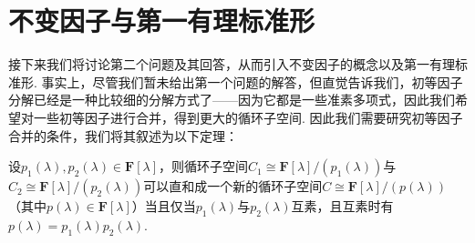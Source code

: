 \section{不变因子与第一有理标准形}
接下来我们将讨论第二个问题及其回答，从而引入不变因子的概念以及第一有理标准形. 事实上，尽管我们暂未给出第一个问题的解答，但直觉告诉我们，初等因子分解已经是一种比较细的分解方式了——因为它都是一些准素多项式，因此我们希望对一些初等因子进行合并，得到更大的循环子空间. 因此我们需要研究初等因子合并的条件，我们将其叙述为以下定理：
\begin{theorem} \label{thm:20:初等因子组合}
    设$p_1(\lambda),p_2(\lambda)\in\mathbf{F}[\lambda]$，则循环子空间$C_1\cong\mathbf{F}[\lambda]/(p_1(\lambda))$与$C_2\cong\mathbf{F}[\lambda]/(p_2(\lambda))$可以直和成一个新的循环子空间$C\cong\mathbf{F}[\lambda]/(p(\lambda))$（其中$p(\lambda)\in\mathbf{F}[\lambda]$）当且仅当$p_1(\lambda)$与$p_2(\lambda)$互素，且互素时有$p(\lambda)=p_1(\lambda)p_2(\lambda)$.
\end{theorem}
